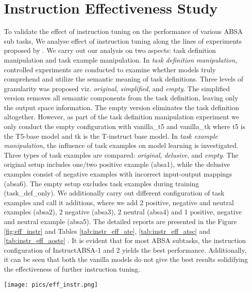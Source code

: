 \documentclass[11pt]{article}
\newcommand{\name}{\textsc{I}nstruct\textsc{ABSA}\xspace}
\begin{document}
\section{Instruction Effectiveness Study}
To validate the effect of instruction tuning on the performance of various ABSA sub tasks, 
We analyse effect of instruction tuning along the lines of experiments proposed by \citet{kung2023models}. 
We carry out our analysis on two aspects: task definition manipulation and task example manipulation. 
In \emph{task definition manipulation}, controlled experiments are conducted to examine whether models truly comprehend and utilize the semantic meaning of task definitions. 
Three levels of granularity was proposed viz. \emph{original}, \emph{simplified}, and \emph{empty}. 
The simplified version removes all semantic components from the task definition, leaving only the output space information. 
The empty version eliminates the task definition altogether. 
However, as part of the task definition manipulation experiment we only conduct the empty configuration with vanilla\_t5 and vanilla\_tk where t5 is the T5-base model and tk is the T-instruct base model. 
In \emph{task example manipulation}, the influence of task examples on model learning is investigated. 
Three types of task examples are compared: \emph{original}, \emph{delusive}, and \emph{empty}. 
The original setup includes one/two positive example (absa1), while the delusive examples consist of negative examples with incorrect input-output mappings (absa6). 
The empty setup excludes task examples during training (task\_def\_only). 
We additionally carry out different configuration of task examples and call it additions, where we add 2 positive, negative and neutral examples (absa2), 2 negative (absa3), 2 neutral (absa4) and 1 positive, negative and neutral example (absa5). 
The detailed reports are presented in the Figure \ref{fig:eff_instr} and Tables \ref{tab:instr_eff_ate}, \ref{tab:instr_eff_atsc} and \ref{tab:instr_eff_aoste} . 
It is evident that for most ABSA subtasks, the instruction configuration of \name{}-1 and 2 yields the best performance. 
Additionally, it can be seen that both the vanilla models do not give the best results solidifying the effectiveness of further instruction tuning. 

\begin{figure*}[ht!]
	\centering
	\texttt{[image: pics/eff\_instr.png]}
	\caption{Comparison of various instruction configuration and its performance on ATE, AOSTE and ATSC subtasks. 
 Vanilla\_t5 and Vanilla\_tk represent the models trained without any instruction. 
 absa1, absa2, absa3, absa4, absa5 are different instruction configurations that include a definition followed by 2 positive, 2 positive, negative and neutral examples, 2 negative examples, 2 neutral examples, 1 positive, negative and neutral examples and finally examples with incorrect input and output mappings respectively. task\_def\_only only contains the task definitions.}
	\label{fig:eff_instr}
\end{figure*} 
\end{document}
